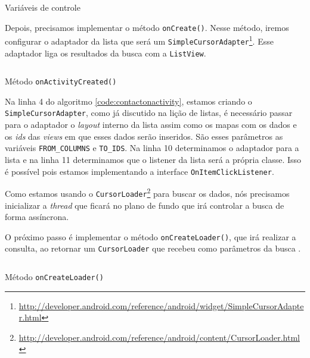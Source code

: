 \documentclass[a4paper,12pt,brazil]{book}
\begin{document}
\begin{singlespace}
		\begin{listing}[H]
		\inputminted[linenos=true,fontsize=\small,frame=lines, framesep=2mm, tabsize=2,numbersep=5pt]{java}{src/api/contacts/lastvar.java}
		\caption{Variáveis de controle}
		\label{code:contactlastvar}
		\end{listing} 	

	Depois, precisamos implementar o método \texttt{onCreate()}. Nesse método, iremos configurar o adaptador da lista que será um \texttt{SimpleCursorAdapter}\footnote{\href{http://developer.android.com/reference/android/widget/SimpleCursorAdapter.html}{http://developer.android.com/reference/android/widget/SimpleCursorAdapter.html}}. Esse adaptador liga os resultados da busca com a \texttt{ListView}.

		\begin{listing}[H]
		\inputminted[linenos=true,fontsize=\small,frame=lines, framesep=2mm, tabsize=2,numbersep=5pt]{java}{src/api/contacts/onactivity.java}
		\caption{Método \texttt{onActivityCreated()}}
		\label{code:contactonactivity}
		\end{listing} 	

	Na linha 4 do algoritmo \ref{code:contactonactivity}, estamos criando o \texttt{SimpleCursorAdapter}, como já discutido na lição de listas, é necessário passar para o adaptador o \emph{layout} interno da lista assim como os mapas com os dados e os \emph{ids} das \emph{views} em que esses dados serão inseridos. São esses parâmetros as variáveis \texttt{FROM\_COLUMNS} e \texttt{TO\_IDS}. Na linha 10 determinamos o adaptador para a lista e na linha 11 determinamos que o listener da lista será a própria classe. Isso é possível pois estamos implementando a interface \texttt{OnItemClickListener}.

	Como estamos usando o \texttt{CursorLoader}\footnote{\href{http://developer.android.com/reference/android/content/CursorLoader.html}{http://developer.android.com/reference/android/content/CursorLoader.html}} para buscar os dados, nós precisamos inicializar a \emph{thread} que ficará no plano de fundo que irá controlar a busca de forma assíncrona. 

	O próximo passo é implementar o método \texttt{onCreateLoader()}, que irá realizar a consulta, ao retornar um \texttt{CursorLoader} que recebeu como parâmetros da busca .

		\begin{listing}[H]
		\inputminted[linenos=true,fontsize=\small,frame=lines, framesep=2mm, tabsize=2,numbersep=5pt]{java}{src/api/contacts/oncreateloader.java}
		\caption{Método \texttt{onCreateLoader()}}
		\label{code:contactoncreateloader}
		\end{listing} 	


\end{singlespace}
\end{document}
